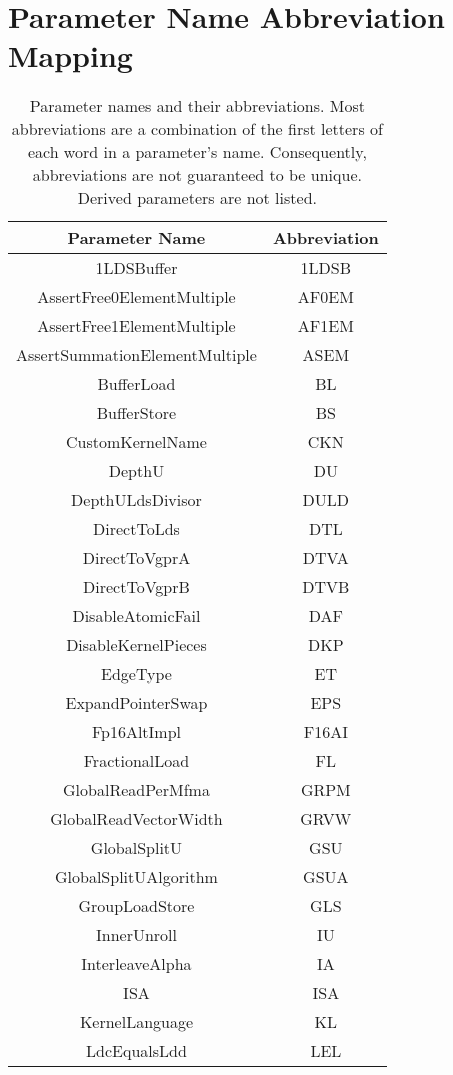 \documentclass[]{article}
\begin{document}
\section{Parameter Name Abbreviation Mapping}
\begin{center}
\begin{small}
\begin{longtable}{ |c|c| }
\caption{Parameter names and their abbreviations. Most abbreviations are a combination of the first letters of each word in a parameter's name. Consequently, abbreviations are not guaranteed to be unique. Derived parameters are not listed. }
\label{tab:ParameterAbbrMap} \\
 \hline
 \textbf{Parameter Name} & \textbf{Abbreviation} \\
 \hline
 1LDSBuffer & 1LDSB \\
 AssertFree0ElementMultiple & AF0EM \\
 AssertFree1ElementMultiple & AF1EM \\
 AssertSummationElementMultiple & ASEM \\
 BufferLoad & BL \\
 BufferStore & BS \\
 CustomKernelName & CKN \\
 DepthU & DU \\
 DepthULdsDivisor & DULD \\
 DirectToLds & DTL \\
 DirectToVgprA & DTVA \\
 DirectToVgprB & DTVB \\
 DisableAtomicFail & DAF \\
 DisableKernelPieces & DKP \\
 EdgeType & ET \\
 ExpandPointerSwap & EPS \\
 Fp16AltImpl & F16AI \\
 FractionalLoad & FL \\
 GlobalReadPerMfma & GRPM \\
 GlobalReadVectorWidth & GRVW \\
 GlobalSplitU & GSU \\
 GlobalSplitUAlgorithm & GSUA \\
 GroupLoadStore & GLS \\
 InnerUnroll & IU \\
 InterleaveAlpha & IA \\
 ISA & ISA \\
 KernelLanguage & KL \\
 LdcEqualsLdd & LEL \\

\end{longtable}
\end{small}
\end{center}
\end{document}
